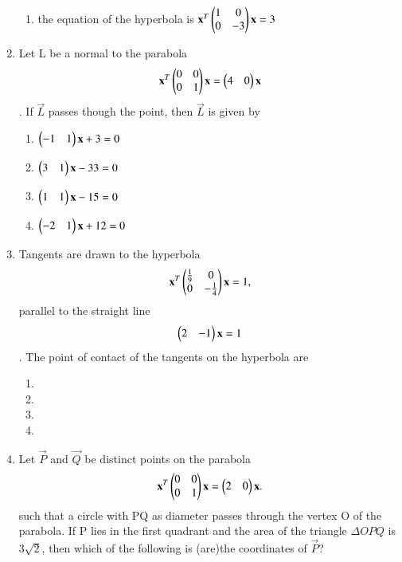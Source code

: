 \begin{enumerate}[label=\arabic*.,ref=\thesubsection.\theenumi]
\begin{enumerate}
    \item the equation of the hyperbola is $\mathbf{x}^T  
    \begin{pmatrix}1& 0 \\0 & -3 \end{pmatrix}\mathbf{x}=3$
    \end{enumerate}
    \item Let L be a normal to the parabola
    \begin{align}
    \mathbf{x}^T \begin{pmatrix}0& 0 \\0 & 1\end{pmatrix} \mathbf{x}=\begin{pmatrix}4&0\end{pmatrix}\mathbf{x}
    \end{align}. If $\vec{L}$ passes though the point, then $\vec{L}$ is given by
    \begin{enumerate}
    \item $\begin{pmatrix}-1&1\end{pmatrix}\mathbf{x}+3=0$
    \item $\begin{pmatrix}3&1\end{pmatrix}\mathbf{x}-33=0$
    \item $\begin{pmatrix}1&1\end{pmatrix}\mathbf{x}-15=0$
    \item $\begin{pmatrix}-2&1\end{pmatrix}\mathbf{x}+12=0$
    \end{enumerate}
    \item Tangents are drawn to the hyperbola
    \begin{align}
    \mathbf{x}^T \begin{pmatrix}\frac{1}{9}& 0 \\0 & -\frac{1}{4}\end{pmatrix}\mathbf{x}=1,
    \end{align} parallel to the straight line
    \begin{align}
    \begin{pmatrix}2&-1\end{pmatrix}\mathbf{x}=1
    \end{align}. The point of contact of the tangents on the hyperbola are 
    \begin{enumerate}
    \item {}
    \item {}
    \item {}
    \item {}
    \end{enumerate}
    \item Let $\vec{P}$ and $\vec{Q}$ be distinct points on the parabola
    \begin{align}
    \mathbf{x}^T \begin{pmatrix}0& 0 \\0 & 1\end{pmatrix}\mathbf{x}=\begin{pmatrix}2&0\end{pmatrix}\mathbf{x}.
    \end{align} such that a circle with PQ as diameter passes through the vertex O of the parabola. 		If P lies in the first quadrant and the area of the triangle $\Delta OPQ$ is $3\sqrt{2}$, then 			which of the following is (are)the coordinates of $\vec{P}$?

\end{enumerate}
